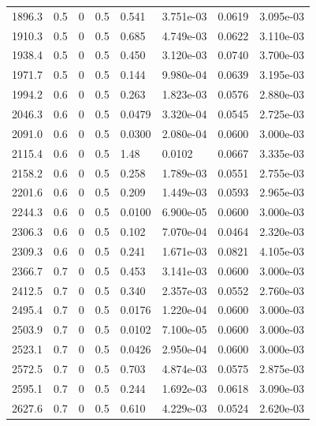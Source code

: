 \documentclass[preview]{standalone}
\begin{document}
{{{\begin{tabular}{L{1.2cm}C{1.2cm} C{0.3cm}C{0.5cm} C{1.4cm}C{1.4cm} C{1.4cm}C{1.4cm}}
  1896.3  &   0.5  & 0     & 0.5 &  0.541  & 3.751e-03  & 0.0619 &  3.095e-03   \\ 
  1910.3  &   0.5  & 0     & 0.5 &  0.685  & 4.749e-03  & 0.0622 &  3.110e-03   \\ 
  1938.4  &   0.5  & 0     & 0.5 &  0.450  & 3.120e-03  & 0.0740 &  3.700e-03   \\ 
  1971.7  &   0.5  & 0     & 0.5 &  0.144  & 9.980e-04  & 0.0639 &  3.195e-03   \\ 
  1994.2  &   0.6  & 0     & 0.5 &  0.263  & 1.823e-03  & 0.0576 &  2.880e-03   \\ 
  2046.3  &   0.6  & 0     & 0.5 &  0.0479  & 3.320e-04  & 0.0545 &  2.725e-03   \\ 
  2091.0  &   0.6  & 0     & 0.5 &  0.0300  & 2.080e-04  & 0.0600 &  3.000e-03   \\ 
  2115.4  &   0.6  & 0     & 0.5 &  1.48  & 0.0102  & 0.0667 &  3.335e-03   \\ 
  2158.2  &   0.6  & 0     & 0.5 &  0.258  & 1.789e-03  & 0.0551 &  2.755e-03   \\ 
  2201.6  &   0.6  & 0     & 0.5 &  0.209  & 1.449e-03  & 0.0593 &  2.965e-03   \\ 
  2244.3  &   0.6  & 0     & 0.5 &  0.0100  & 6.900e-05  & 0.0600 &  3.000e-03   \\ 
  2306.3  &   0.6  & 0     & 0.5 &  0.102  & 7.070e-04  & 0.0464 &  2.320e-03   \\ 
  2309.3  &   0.6  & 0     & 0.5 &  0.241  & 1.671e-03  & 0.0821 &  4.105e-03   \\ 
  2366.7  &   0.7  & 0     & 0.5 &  0.453  & 3.141e-03  & 0.0600 &  3.000e-03   \\ 
  2412.5  &   0.7  & 0     & 0.5 &  0.340  & 2.357e-03  & 0.0552 &  2.760e-03   \\ 
  2495.4  &   0.7  & 0     & 0.5 &  0.0176  & 1.220e-04  & 0.0600 &  3.000e-03   \\ 
  2503.9  &   0.7  & 0     & 0.5 &  0.0102  & 7.100e-05  & 0.0600 &  3.000e-03   \\ 
  2523.1  &   0.7  & 0     & 0.5 &  0.0426  & 2.950e-04  & 0.0600 &  3.000e-03   \\ 
  2572.5  &   0.7  & 0     & 0.5 &  0.703  & 4.874e-03  & 0.0575 &  2.875e-03   \\ 
  2595.1  &   0.7  & 0     & 0.5 &  0.244  & 1.692e-03  & 0.0618 &  3.090e-03   \\ 
  2627.6  &   0.7  & 0     & 0.5 &  0.610  & 4.229e-03  & 0.0524 &  2.620e-03   \\ 

\end{tabular}}}}
\end{document}
